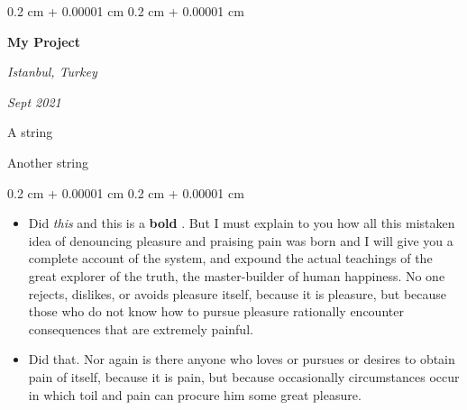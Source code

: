 \documentclass[10pt, letterpaper]{article}
\newenvironment{summary}{
    \begin{description}[
        topsep=0.10 cm,
        parsep=0.10 cm,
        partopsep=0pt,
        itemsep=0pt,
        leftmargin=0.4 cm + 10pt
    ]
}{
    \end{description}
} %
\newenvironment{highlights}{
    \begin{itemize}[
        topsep=0.10 cm,
        parsep=0.10 cm,
        partopsep=0pt,
        itemsep=0pt,
        leftmargin=0.4 cm + 10pt
    ]
}{
    \end{itemize}
} %
\newenvironment{onecolentry}{
    \begin{adjustwidth}{
        0.2 cm + 0.00001 cm
    }{
        0.2 cm + 0.00001 cm
    }
}{
    \end{adjustwidth}
} %
\newenvironment{twocolentry}[2][]{
    \onecolentry
    \def\secondColumn{#2}
    \setcolumnwidth{\fill, 4.5 cm}
    \begin{paracol}{2}
}{
    \switchcolumn \raggedleft \secondColumn
    \end{paracol}
    \endonecolentry
} %
\let\hrefWithoutArrow\href
\renewcommand{\href}[2]{\hrefWithoutArrow{#1}{\ifthenelse{\equal{#2}{}}{ }{#2 }\raisebox{.15ex}{\footnotesize \faExternalLink*}}}
\begin{document}
        \begin{twocolentry}{
        \textit{Istanbul, Turkey}    
            
        \textit{Sept 2021}}
            \textbf{My Project}
        \end{twocolentry}
            \begin{summary}
                \item A string
                \item Another string
            \end{summary}
        \vspace{0.10 cm}
        \begin{onecolentry}
            \begin{highlights}
                \item Did \textit{this} and this is a \textbf{bold} \href{https://example.com}{link}. But I must explain to you how all this mistaken idea of denouncing pleasure and praising pain was born and I will give you a complete account of the system, and expound the actual teachings of the great explorer of the truth, the master-builder of human happiness. No one rejects, dislikes, or avoids pleasure itself, because it is pleasure, but because those who do not know how to pursue pleasure rationally encounter consequences that are extremely painful.
                \item Did that. Nor again is there anyone who loves or pursues or desires to obtain pain of itself, because it is pain, but because occasionally circumstances occur in which toil and pain can procure him some great pleasure.
            \end{highlights}
        \end{onecolentry}


        \vspace{0.2 cm}
\end{document}
